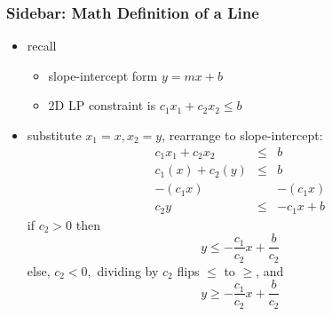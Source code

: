 \documentclass[10pt,aspectratio=169]{beamer}
\begin{document}
\begin{frame} \frametitle{Sidebar: Math Definition of a Line}
  \begin{itemize}
    \item recall
    \begin{itemize}
    \item slope-intercept form $y=mx+b$
    \item 2D LP constraint is $c_1 x_1 + c_2 x_2 \leq b$
  \end{itemize}
  \item substitute $x_1=x, x_2=y$, rearrange to slope-intercept:
    \begin{eqnarray*}
      c_1 x_1 + c_2 x_2 &\leq& b \\
      c_1 (x) + c_2 (y) &\leq& b \\
      -(c_1 x) & & -(c_1 x) \\
      c_2 y &\leq& -c_1 x + b
    \end{eqnarray*}
    if $c_2 >0$ then
    \[ y \leq -\frac{c_1}{c_2}x + \frac{b}{c_2} \]
    else, $c_2<0,$ dividing by $c_2$ flips $\leq$ to $\geq$, and
    \[ y \geq -\frac{c_1}{c_2}x + \frac{b}{c_2} \]
  \end{itemize}
\end{frame}
\end{document}
